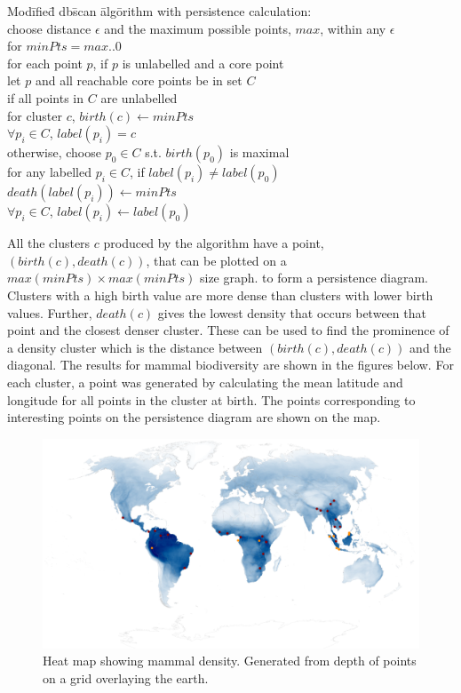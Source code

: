 \documentclass[11pt, fullpage,letterpaper]{article}
\begin{document}
		\begin{tabbing}
			Mod\= ifie\= d db\= scan \= alg\= orithm with persistence calculation:\\
			\> choose distance $\epsilon$ and the maximum possible points, $max$, within any $\epsilon$\\
			\> for $minPts = max..0$\\
			\> \> for each point $p$, if $p$ is unlabelled and a core point\\
			\> \> \> let $p$ and all reachable core points be in set $C$\\
			\> \> \> \> if all points in $C$ are unlabelled\\
			\> \> \> \> \> for cluster $c$, $birth(c) \leftarrow minPts$\\
			\> \> \> \> \> $\forall p_i \in C$, $label(p_i) = c$\\
			\> \> \> otherwise, choose $p_0 \in C$ s.t. $birth(p_0)$ is maximal\\
			\> \> \> \> for any labelled $p_i \in C$, if $label(p_i) \neq label(p_0)$\\
			\> \> \> \> \> $death(label(p_i)) \leftarrow minPts$\\
			\> \> \> \> \> $\forall p_i \in C$, $label(p_i) \leftarrow label(p_0)$\\
		\end{tabbing}
		
		All the clusters $c$ produced by the algorithm have a point, $(birth(c), death(c))$, that can be plotted on a $max(minPts) \times max(minPts)$ size graph.  to form a persistence diagram. Clusters with a high birth value are more dense than clusters with lower birth values. Further, $death(c)$ gives the lowest density that occurs between that point and the closest denser cluster. These can be used to find the prominence of a density cluster which is the distance between $(birth(c), death(c))$ and the diagonal. The results for mammal biodiversity are shown in the figures below. For each cluster, a point was generated by calculating the mean latitude and longitude for all points in the cluster at birth. The points corresponding to interesting points on the persistence diagram are shown on the map.
		
		\begin{figure}[H]
			\centering
			\includegraphics[width=20cm]{map.png}
			\caption{Heat map showing mammal density. Generated from depth of points on a grid overlaying the earth.}
		\end{figure}
		
\end{document}
